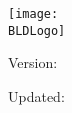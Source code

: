 
\thispagestyle{empty}
\begin{titlepage}
  \begin{center}
    \vspace*{2cm}

    \ifdefined\BLDLogo
      \makeatletter\providecommand{\bldIfNonempty}[3]{\edef\@tempa{#1}\ifx\@tempa\empty #2\else #3\fi}\makeatother
      \bldIfNonempty{\BLDLogo}{}{\texttt{[image: \\BLDLogo]}\par\vspace{1.5cm}}%
    \fi

    {\Large \textbf{\BLDTitle}\par}
    \vspace{0.75cm}
    
    \ifdefined\BLDVersion
      \ifx\BLDVersion\empty
      \else
        {\large Version: \BLDVersion\par}
        \vspace{0.25cm}
      \fi
    \fi
    
    \ifdefined\BLDUpdated
      \ifx\BLDUpdated\empty
      \else
        {\normalsize Updated: \BLDUpdated\par}
      \fi
    \fi

    \vfill
  \end{center}
\end{titlepage}
